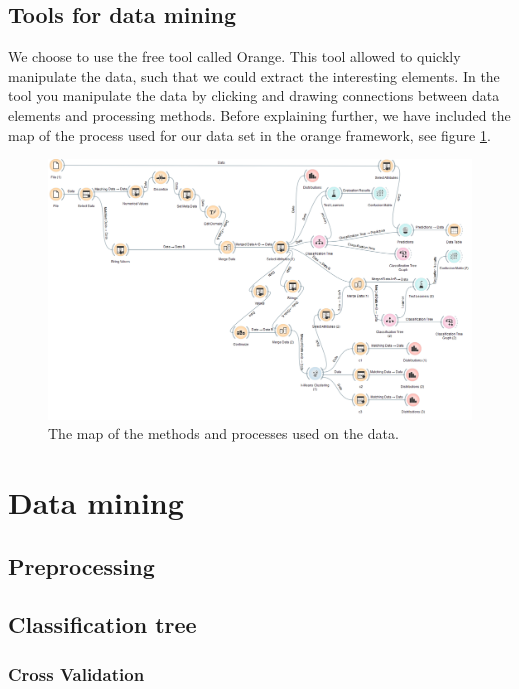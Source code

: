 \documentclass[a4paper,11pt]{article}
\begin{document}
\subsection{Tools for data mining}
We choose to use the free tool called Orange\cite{orange}. This tool allowed to quickly manipulate the data, such that we could extract the interesting elements. 
In the tool you manipulate the data by clicking and drawing connections between data elements and processing methods. Before explaining further, we have included the map of the process used for our data set in the orange framework, see figure \ref{OrangeMap}.

\begin{figure}[h]
	\centering
	\includegraphics[scale=0.35]{orangeMap}
	\caption{The map of the methods and processes used on the data.}
	\label{OrangeMap}
\end{figure}


\section{Data mining}
\subsection{Preprocessing}
\subsection{Classification tree}
\subsubsection{Cross Validation}
\end{document}
